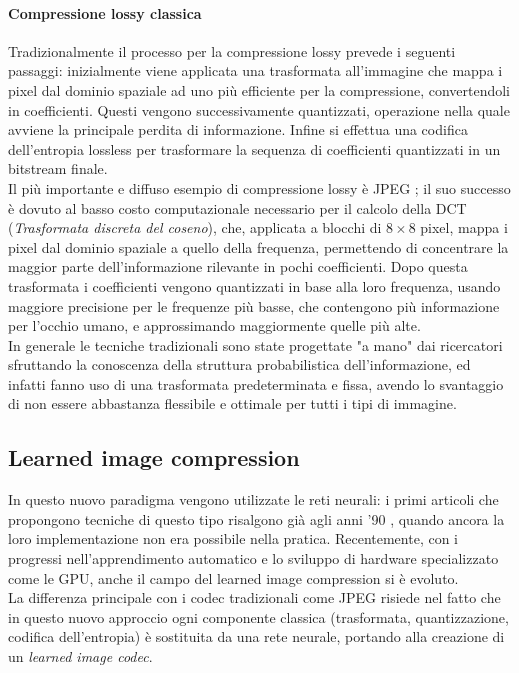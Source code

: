 \paragraph{Compressione lossy classica}
Tradizionalmente il processo per la compressione lossy prevede i seguenti passaggi: inizialmente viene applicata una trasformata all'immagine che mappa i pixel dal dominio spaziale ad uno più efficiente per la compressione, convertendoli in coefficienti. Questi vengono successivamente quantizzati, operazione nella quale avviene la principale perdita di informazione. Infine si effettua una codifica dell'entropia lossless per trasformare la sequenza di coefficienti quantizzati in un bitstream finale.\\
Il più importante e diffuso esempio di compressione lossy è JPEG \cite{jpeg}; il suo successo è dovuto al basso costo computazionale necessario per il calcolo della DCT (\textit{Trasformata discreta del coseno}), che, applicata a blocchi di $8 \times 8 $ pixel, mappa i pixel dal dominio spaziale a quello della frequenza, permettendo di concentrare la maggior parte dell'informazione rilevante in pochi coefficienti. Dopo questa trasformata i coefficienti vengono quantizzati in base alla loro frequenza, usando maggiore precisione per le frequenze più basse, che contengono più informazione per l'occhio umano, e approssimando maggiormente quelle più alte. \\
In generale le tecniche tradizionali sono state progettate "a mano" dai ricercatori sfruttando la conoscenza della struttura probabilistica dell'informazione, ed infatti fanno uso di una trasformata predeterminata e fissa, avendo lo svantaggio di non essere abbastanza flessibile e ottimale per tutti i tipi di immagine.
\subsection*{Learned image compression}
In questo nuovo paradigma vengono utilizzate le reti neurali: i primi articoli che propongono tecniche di questo tipo risalgono già agli anni '90 \cite{sonehara1989image, sicuranza1990artificial}, quando ancora la loro implementazione non era possibile nella pratica. Recentemente, con i progressi nell'apprendimento automatico e lo sviluppo di hardware specializzato come le GPU, anche il campo del learned image compression si è evoluto.\\
La differenza principale con i codec tradizionali come JPEG risiede nel fatto che in questo nuovo approccio ogni componente classica (trasformata, quantizzazione, codifica dell'entropia) è sostituita da una rete neurale, portando alla creazione di un \textit{learned image codec}.
